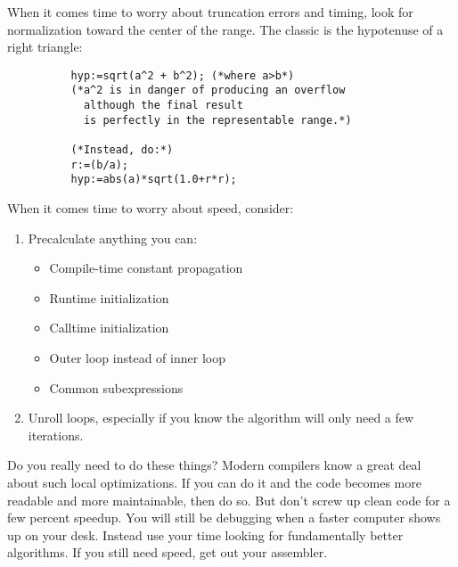 When it comes time to worry about truncation errors and
timing, look for normalization toward the center of the
range.  The classic is the hypotenuse of a right triangle:
\begin{verbatim}
          hyp:=sqrt(a^2 + b^2); (*where a>b*)
          (*a^2 is in danger of producing an overflow
            although the final result
            is perfectly in the representable range.*)
          
          (*Instead, do:*)
          r:=(b/a);
          hyp:=abs(a)*sqrt(1.0+r*r);
\end{verbatim}

When it comes time to worry about speed, consider:
\begin{enumerate}
     \item Precalculate anything you can:
     \begin{itemize}
          \item Compile-time constant propagation
          \item Runtime initialization
          \item Calltime initialization
          \item Outer loop instead of inner loop
          \item Common subexpressions
      \end{itemize}

     \item Unroll loops, especially if you know the algorithm will
     only need a few iterations.
\end{enumerate}
     
Do you really need to do these things?  Modern compilers
know a great deal about such local optimizations.  If you
can do it and the code becomes more readable and more
maintainable, then do so.  But don't screw up clean code for
a few percent speedup.  You will still be debugging when a
faster computer shows up on your desk.  Instead use your
time looking for fundamentally better algorithms.  If you
still need speed, get out your assembler.
